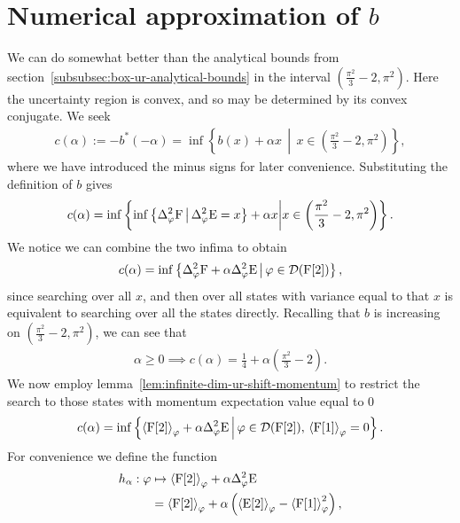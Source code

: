 \section{Numerical approximation of $b$}\label{sec:box-ur-numerics}

We can do somewhat better than the analytical bounds from section~\ref{subsubsec:box-ur-analytical-bounds} in the interval $\left(\frac{\pi^2}{3} -2,\pi^2\right)$. Here the uncertainty region is convex, and so may be determined by its convex conjugate. We seek
\begin{align}
  c(\alpha) := -b^*(-\alpha) = \inf \left\{b(x) + \alpha x\,\middle|\,x\in \left(\frac{\pi^2}{3} -2,\pi^2\right)\right\},
\end{align}
where we have introduced the minus signs for later convenience. Substituting the definition of $b$ gives
\begin{align}
  c(\alpha) = \inf \left\{\inf\left\{\var[\varphi]{\opf}\,\middle|\,\var[\varphi]{\ope} = x \right\} + \alpha x\middle| x\in\left(\frac{\pi^2}{3} -2,\pi^2\right)\right\}.
\end{align}
We notice we can combine the two infima to obtain
\begin{align}
  c(\alpha) = \inf\left\{\var[\varphi]{\opf} + \alpha \var[\varphi]{\ope}\,\middle|\,\varphi\in\dom{\opf[2]}\right\},
\end{align}
since searching over all $x$, and then over all states with variance equal to that $x$ is equivalent to searching over all the states directly. Recalling that $b$ is increasing on $\left(\frac{\pi^2}{3} -2,\pi^2\right)$, we can see that
\begin{align}
  \alpha \geq 0 \implies c(\alpha) = \frac{1}{4} + \alpha \left(\frac{\pi^2}{3} -2\right).
\end{align}
We now employ lemma~\ref{lem:infinite-dim-ur-shift-momentum} to restrict the search to those states with momentum expectation value equal to $0$
\begin{align}
  c(\alpha) = \inf\left\{\expe{\opf[2]}{\varphi} + \alpha \var[\varphi]{\ope}\,\middle|\,\varphi\in\dom{\opf[2]},\,\expe{\opf[1]}{\varphi} = 0\right\}.
\end{align}
For convenience we define the function
\begin{align}
  h_{\alpha} : \varphi &\mapsto \expe{\opf[2]}{\varphi} + \alpha \var[\varphi]{\ope}\\
                    &= \expe{\opf[2]}{\varphi} + \alpha\left(\expe{\ope[2]}{\varphi} - \expe{\opf[1]}{\varphi}^2\right),
\end{align}
